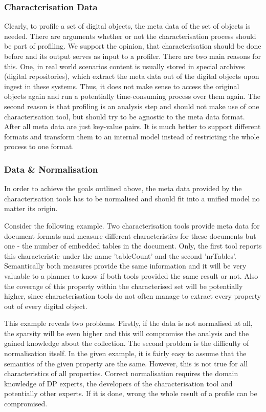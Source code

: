 \subsubsection{Characterisation Data}
Clearly, to profile a set of digital objects, the meta data of the set of objects is needed. There are arguments whether or not the characterisation process should be part of profiling. We support the opinion, that characterisation should be done before and its output serves as input to a profiler. There are two main reasons for this. One, in real world scenarios content is usually stored in special archives (digital repositories), which extract the meta data out of the digital objects upon ingest in these systems. Thus, it does not make sense to access the original objects again and run a potentially time-consuming process over them again. The second reason is that profiling is an analysis step and should not make use of one characterisation tool, but should try to be agnostic to the meta data format. After all meta data are just key-value pairs. It is much better to support different formats and transform them to an internal model instead of restricting the whole process to one format.

\subsubsection{Data \& Normalisation}
In order to achieve the goals outlined above, the meta data provided by the characterisation tools has to be normalised and should fit into a unified model no matter its origin.

Consider the following example. Two characterisation tools provide meta data for document formats and measure different characteristics for these documents but one - the number of embedded tables in the document. Only, the first tool reports this characteristic under the name 'tableCount' and the second 'nrTables'. Semantically both measures provide the same information and it will be very valuable to a planner to know if both tools provided the same result or not. Also the coverage of this property within the characterised set will be potentially higher, since characterisation tools do not often manage to extract every property out of every digital object.

This example reveals two problems. Firstly, if the data is not normalised at all, the sparsity will be even higher and this will compromise the analysis and the gained knowledge about the collection. The second problem is the difficulty of normalisation itself. In the given example, it is fairly easy to assume that the semantics of the given property are the same. However, this is not true for all characteristics of all properties. Correct normalisation requires the domain knowledge of DP experts, the developers of the characterisation tool and potentially other experts. If it is done, wrong the whole result of a profile can be compromised.

